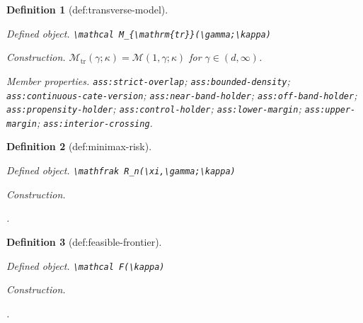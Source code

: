 \documentclass{article}
\newtheorem{definition}{Definition}
\begin{document}
\begin{definition}[def:transverse-model]\label{def:transverse-model}
\par\smallskip\noindent\emph{Defined object.} \texttt{\textbackslash{}\allowbreak{}mathcal M\_\allowbreak{}\{\textbackslash{}\allowbreak{}mathrm\{tr\}\allowbreak{}\}\allowbreak{}(\textbackslash{}\allowbreak{}gamma;\allowbreak{}\textbackslash{}\allowbreak{}kappa)}
\par\smallskip\noindent\emph{Construction.} \(\mathcal M_{\mathrm{tr}}(\gamma;\kappa)=\mathcal M(1,\gamma;\kappa)\) for \(\gamma\in(d,\infty)\).
\par\smallskip\noindent\emph{Member properties.} \texttt{ass:\allowbreak{}strict-\allowbreak{}overlap}; \texttt{ass:\allowbreak{}bounded-\allowbreak{}density}; \texttt{ass:\allowbreak{}continuous-\allowbreak{}cate-\allowbreak{}version}; \texttt{ass:\allowbreak{}near-\allowbreak{}band-\allowbreak{}holder}; \texttt{ass:\allowbreak{}off-\allowbreak{}band-\allowbreak{}holder}; \texttt{ass:\allowbreak{}propensity-\allowbreak{}holder}; \texttt{ass:\allowbreak{}control-\allowbreak{}holder}; \texttt{ass:\allowbreak{}lower-\allowbreak{}margin}; \texttt{ass:\allowbreak{}upper-\allowbreak{}margin}; \texttt{ass:\allowbreak{}interior-\allowbreak{}crossing}.
\end{definition}

\begin{definition}[def:minimax-risk]\label{def:minimax-risk}
\par\smallskip\noindent\emph{Defined object.} \texttt{\textbackslash{}\allowbreak{}mathfrak R\_\allowbreak{}n(\textbackslash{}\allowbreak{}xi,\allowbreak{}\textbackslash{}\allowbreak{}gamma;\allowbreak{}\textbackslash{}\allowbreak{}kappa)}
\par\smallskip\noindent\emph{Construction.} \leavevmode\par\noindent {}\par\noindent.
\end{definition}

\begin{definition}[def:feasible-frontier]\label{def:feasible-frontier}
\par\smallskip\noindent\emph{Defined object.} \texttt{\textbackslash{}\allowbreak{}mathcal F(\textbackslash{}\allowbreak{}kappa)}
\par\smallskip\noindent\emph{Construction.} \leavevmode\par\noindent {}\par\noindent.
\end{definition}
\end{document}

